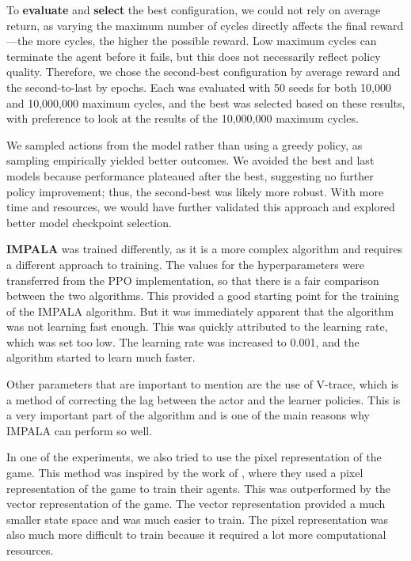 \documentclass[12pt,a4paper, onecolumn]{exam}
\begin{document}
To \textbf{evaluate} and \textbf{select} the best configuration, we could not rely on average return, as varying the maximum number of cycles directly affects the final reward—the more cycles,
the higher the possible reward. Low maximum cycles can terminate the agent before it fails, but this does not necessarily reflect policy quality.
Therefore, we chose the second-best configuration by average reward and the second-to-last by epochs. Each was evaluated with 50 seeds for
both 10,000 and 10,000,000 maximum cycles, and the best was selected based on these results, with preference to look at the results of the 10,000,000 maximum cycles.

We sampled actions from the model rather
than using a greedy policy, as sampling empirically yielded better outcomes. We avoided the best and last models because performance
plateaued after the best, suggesting no further policy improvement; thus, the second-best was likely more robust. With more time and
resources, we would have further validated this approach and explored better model checkpoint selection.

\textbf{IMPALA} was trained differently, as it is a more complex algorithm and requires a different approach to training.
The values for the hyperparameters were transferred from the PPO implementation, so that there is a fair comparison between the two algorithms.
This provided a good starting point for the training of the IMPALA algorithm. But it was immediately apparent that the algorithm was not learning fast enough.
This was quickly attributed to the learning rate, which was set too low. The learning rate was increased to 0.001, and the algorithm started to learn much faster.

Other parameters that are important to mention are the use of V-trace, which is a method of correcting the lag between the actor and the learner policies.
This is a very important part of the algorithm and is one of the main reasons why IMPALA can perform so well.

In one of the experiments, we also tried to use the pixel representation of the game. This method was inspired by the work of \cite{impala},
where they used a pixel representation of the game to train their agents. This was outperformed by the vector representation of the game.
The vector representation provided a much smaller state space and was much easier to train.
The pixel representation was also much more difficult to train because it required a lot more computational resources.
\end{document}
